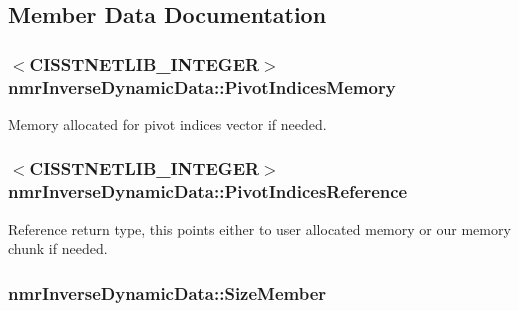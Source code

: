 \subsection{Member Data Documentation}
\hypertarget{classnmr_inverse_dynamic_data_a011a6d0e52a20011ac77ac48ea65dc1b}{
\subsubsection[{Pivot\-Indices\-Memory}]{$<$C\-I\-S\-S\-T\-N\-E\-T\-L\-I\-B\-\_\-\-I\-N\-T\-E\-G\-E\-R$>$ nmr\-Inverse\-Dynamic\-Data\-::\-Pivot\-Indices\-Memory\hspace{0.3cm}{\ttfamily [protected]}}}\label{classnmr_inverse_dynamic_data_a011a6d0e52a20011ac77ac48ea65dc1b}
Memory allocated for pivot indices vector if needed. \hypertarget{classnmr_inverse_dynamic_data_ad6e68ee1c9a9705d80c5b8e69c2ec34d}{
\subsubsection[{Pivot\-Indices\-Reference}]{$<$C\-I\-S\-S\-T\-N\-E\-T\-L\-I\-B\-\_\-\-I\-N\-T\-E\-G\-E\-R$>$ nmr\-Inverse\-Dynamic\-Data\-::\-Pivot\-Indices\-Reference\hspace{0.3cm}{\ttfamily [protected]}}}\label{classnmr_inverse_dynamic_data_ad6e68ee1c9a9705d80c5b8e69c2ec34d}
Reference return type, this points either to user allocated memory or our memory chunk if needed. \hypertarget{classnmr_inverse_dynamic_data_ae4b1064f9e37250025710add092a33cf}{
\subsubsection[{Size\-Member}]{ nmr\-Inverse\-Dynamic\-Data\-::\-Size\-Member\hspace{0.3cm}{\ttfamily [protected]}}}\label{classnmr_inverse_dynamic_data_ae4b1064f9e37250025710add092a33cf}
